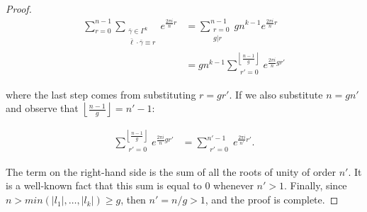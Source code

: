 \documentclass[11pt,a4paper]{tesis}
\theoremstyle{plain}
\theoremstyle{definition}
\begin{document}
\begin{proof}
  \begin{equation*}
    \begin{aligned}
      \sum_{r = 0}^{n - 1}
        \sum_{
          \substack{
            \bar{\gamma} \in \Gamma^k \\
            \bar{\ell} \cdot \bar{\gamma} \equiv r
          }
        } e^{\frac{2 \pi i}{n} r}
      & = \sum_{\substack{
        r = 0 \\
        g | r
      }}^{n - 1} g n^{k - 1} e^{\frac{2 \pi i}{n} r} \\
      & = g n^{k - 1} \sum_{\substack{
        r' = 0
      }}^{\left\lfloor \frac{n - 1}{g} \right\rfloor} e^{\frac{2 \pi i}{n} g r'}
    \end{aligned}
  \end{equation*}

  where the last step comes from substituting $r = g r'$. If we also substitute $n = g n'$ and observe that $\left\lfloor \frac{n - 1}{g} \right\rfloor = n' - 1$:

  \begin{equation*}
    \begin{aligned}
      \sum_{\substack{
        r' = 0
      }}^{\left\lfloor \frac{n - 1}{g} \right\rfloor} e^{\frac{2 \pi i}{n} g r'}
      & = \sum_{\substack{
        r' = 0
      }}^{n' - 1} e^{\frac{2 \pi i}{n'} r'} \text{.}
    \end{aligned}
  \end{equation*}

  The term on the right-hand side is the sum of all the roots of unity of order $n'$. It is a well-known fact that this sum is equal to $0$ whenever $n' > 1$. Finally, since $n > min(|l_1|, \dots, |l_k|) \ge g$, then $n' = n / g > 1$, and the proof is complete.

\end{proof}
\end{document}
